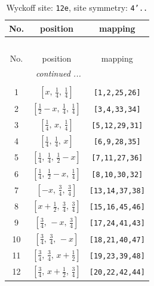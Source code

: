 \documentclass[fleqn,8pt]{jsarticle}
\begin{document}
\begin{longtable}{ccc}
\caption{Wyckoff site: {\tt 12e}, site symmetry: {\tt 4'..}}
 \\
 \hline \hline
No. & position & mapping \\ \hline \endfirsthead

\multicolumn{2}{l}{\tablename\ \thetable{}} \\
 \hline \hline
No. & position & mapping \\ \hline \endhead

 \hline \hline
\multicolumn{2}{r}{\footnotesize\it continued ...} \\ \endfoot

 \hline \hline
\multicolumn{2}{r}{} \\ \endlastfoot

1 & $\left[ x,\, \frac{1}{4},\, \frac{1}{4} \right]$ & {\tt [1,2,25,26]} \\ \hline
2 & $\left[ \frac{1}{2} - x,\, \frac{1}{4},\, \frac{1}{4} \right]$ & {\tt [3,4,33,34]} \\ \hline
3 & $\left[ \frac{1}{4},\, x,\, \frac{1}{4} \right]$ & {\tt [5,12,29,31]} \\ \hline
4 & $\left[ \frac{1}{4},\, \frac{1}{4},\, x \right]$ & {\tt [6,9,28,35]} \\ \hline
5 & $\left[ \frac{1}{4},\, \frac{1}{4},\, \frac{1}{2} - x \right]$ & {\tt [7,11,27,36]} \\ \hline
6 & $\left[ \frac{1}{4},\, \frac{1}{2} - x,\, \frac{1}{4} \right]$ & {\tt [8,10,30,32]} \\ \hline
7 & $\left[ - x,\, \frac{3}{4},\, \frac{3}{4} \right]$ & {\tt [13,14,37,38]} \\ \hline
8 & $\left[ x + \frac{1}{2},\, \frac{3}{4},\, \frac{3}{4} \right]$ & {\tt [15,16,45,46]} \\ \hline
9 & $\left[ \frac{3}{4},\, - x,\, \frac{3}{4} \right]$ & {\tt [17,24,41,43]} \\ \hline
10 & $\left[ \frac{3}{4},\, \frac{3}{4},\, - x \right]$ & {\tt [18,21,40,47]} \\ \hline
11 & $\left[ \frac{3}{4},\, \frac{3}{4},\, x + \frac{1}{2} \right]$ & {\tt [19,23,39,48]} \\ \hline
12 & $\left[ \frac{3}{4},\, x + \frac{1}{2},\, \frac{3}{4} \right]$ & {\tt [20,22,42,44]} \\
\end{longtable}
\renewcommand{\arraystretch}{1.2}
\end{document}
